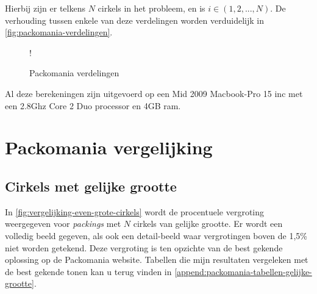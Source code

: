 \documentclass[12pt,a4paper,oneside]{book}
\begin{document}
Hierbij zijn er telkens $N$ cirkels in het probleem, en is $i \in (1,2,...,N)$.
De verhouding tussen enkele van deze verdelingen worden verduidelijk in \autoref{fig:packomania-verdelingen}.

\begin {figure}
	\centering
	 {!} {
	}
	\caption{Packomania verdelingen}
	\label{fig:packomania-verdelingen}
\end {figure}

Al deze berekeningen zijn uitgevoerd op een Mid 2009 Macbook-Pro 15 inc met een 2.8Ghz Core 2 Duo processor en 4GB ram.

\section{Packomania vergelijking}

\subsection{Cirkels met gelijke grootte}

In \autoref{fig:vergelijking-even-grote-cirkels} wordt de procentuele vergroting weergegeven voor \textit{packings} met $N$ cirkels van gelijke grootte.
Er wordt een volledig beeld gegeven, als ook een detail-beeld waar vergrotingen boven de 1,5\% niet worden getekend.
Deze vergroting is ten opzichte van de best gekende oplossing op de Packomania website.
Tabellen die mijn resultaten vergeleken met de best gekende tonen kan u terug vinden in \autoref{append:packomania-tabellen-gelijke-grootte}.
\end{document}
